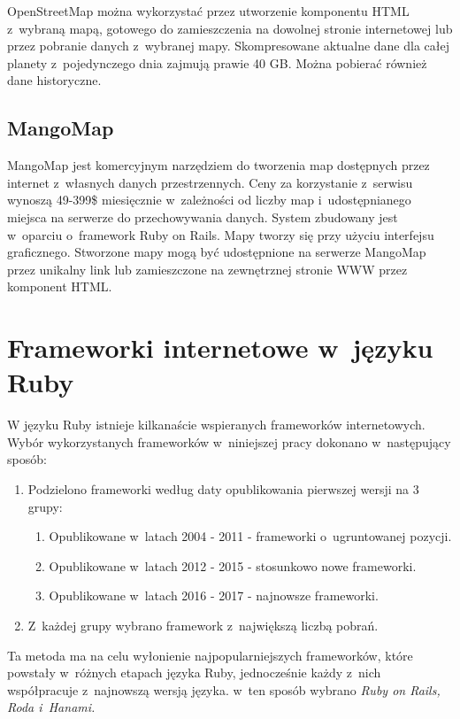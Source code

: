 \documentclass[archivemode]{mgr}
\begin{document}
  OpenStreetMap można wykorzystać przez utworzenie komponentu HTML z~wybraną mapą, gotowego do zamieszczenia na dowolnej stronie internetowej lub przez pobranie danych z~wybranej mapy. Skompresowane aktualne dane dla całej planety z~pojedynczego dnia zajmują prawie 40 GB. Można pobierać również dane historyczne.

\section{MangoMap}

  MangoMap jest komercyjnym narzędziem do tworzenia map dostępnych przez internet z~własnych danych przestrzennych. Ceny za korzystanie z~serwisu wynoszą 49-399\$ miesięcznie w~zależności od liczby map i~udostępnianego miejsca na serwerze do przechowywania danych. System zbudowany jest w~oparciu o~framework Ruby on Rails. Mapy tworzy się przy użyciu interfejsu graficznego. Stworzone mapy mogą być udostępnione na serwerze MangoMap przez unikalny link lub zamieszczone na zewnętrznej stronie WWW przez komponent HTML. \cite{doc_mango}

\chapter{Frameworki internetowe w~języku Ruby}

W języku Ruby istnieje kilkanaście wspieranych frameworków internetowych. Wybór wykorzystanych frameworków w~niniejszej pracy dokonano w~następujący sposób:
  \begin{enumerate}
    \item Podzielono frameworki według daty opublikowania pierwszej wersji na 3 grupy:
    \begin{enumerate}
      \item Opublikowane w~latach 2004 - 2011 - frameworki o~ugruntowanej pozycji.
      \item Opublikowane w~latach 2012 - 2015 - stosunkowo nowe frameworki.
      \item Opublikowane w~latach 2016 - 2017 - najnowsze frameworki.
    \end{enumerate}
    \item Z~każdej grupy wybrano framework z~największą liczbą pobrań.
  \end{enumerate}
Ta metoda ma na celu wyłonienie najpopularniejszych frameworków, które powstały w~różnych etapach języka Ruby, jednocześnie każdy z~nich współpracuje z~najnowszą wersją języka. w~ten sposób wybrano \emph{Ruby on Rails, Roda i~Hanami.}
\end{document}
